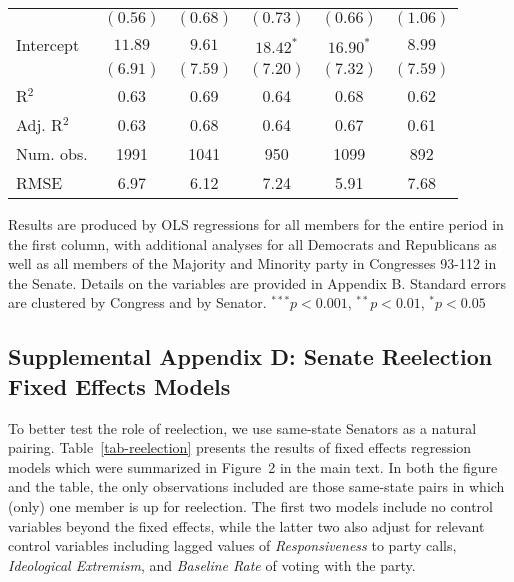 \documentclass[12pt]{article}
\begin{document}
\begin{table}[H]
\begin{threeparttable}
\begin{tabular}{l c c c c c }
                      & $(0.56)$      & $(0.68)$     & $(0.73)$       & $(0.66)$     & $(1.06)$     \\
Intercept             & $11.89$       & $9.61$       & $18.42^{*}$    & $16.90^{*}$  & $8.99$       \\
                      & $(6.91)$      & $(7.59)$     & $(7.20)$       & $(7.32)$     & $(7.59)$     \\
\hline
R$^2$                 & 0.63          & 0.69         & 0.64           & 0.68         & 0.62         \\
Adj. R$^2$            & 0.63          & 0.68         & 0.64           & 0.67         & 0.61         \\
Num. obs.             & 1991          & 1041         & 950            & 1099         & 892          \\
RMSE                  & 6.97          & 6.12         & 7.24           & 5.91         & 7.68         \\
\hline
\end{tabular}
\begin{tablenotes}
   \item
   Results are produced by OLS regressions for all members for the entire period in the first column, with additional analyses for all Democrats and Republicans as well as all members of the Majority and Minority party in Congresses 93-112 in the Senate. Details on the variables are provided in Appendix B.
   Standard errors are clustered by Congress and by Senator.
$^{***}p<0.001$, $^{**}p<0.01$, $^*p<0.05$
 \end{tablenotes}
\end{threeparttable}
\end{table}


\subsection*{Supplemental Appendix D: Senate Reelection Fixed Effects Models}
%

To better test the role of reelection, we use same-state Senators as a natural pairing.
Table~\ref{tab-reelection} presents the results of fixed effects regression models which were summarized in Figure~2 in the main text.
In both the figure and the table, the only observations included are those
same-state pairs in which (only) one member is up for reelection.
The first two models include no control variables beyond the fixed effects, while the latter two also adjust for relevant control variables including lagged values of \textit{Responsiveness} to party calls, \textit{Ideological Extremism}, and \textit{Baseline Rate} of voting with the party.
\end{document}
